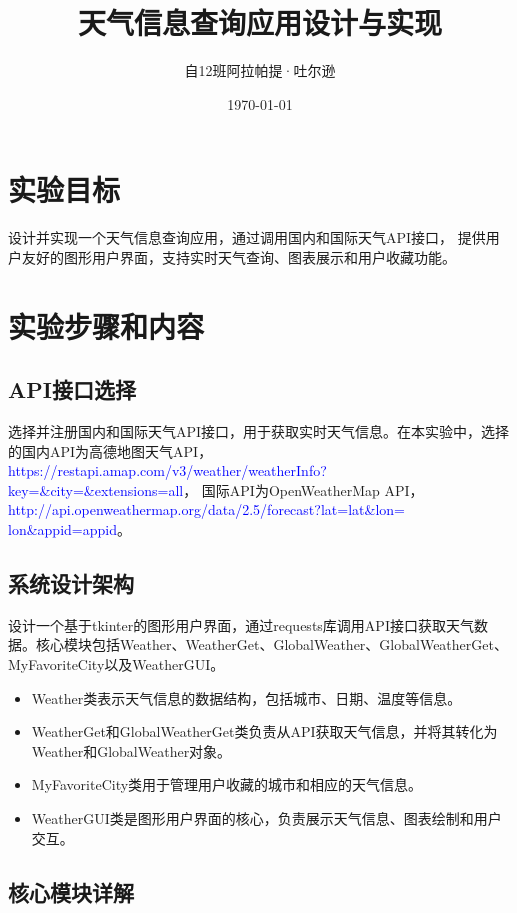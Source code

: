 \documentclass[UTF8]{ctexart}
\title{天气信息查询应用设计与实现}
\author{自12班\quad 阿拉帕提·吐尔逊\quad 2019010363}
\date{\today}
\begin{document}
\maketitle

\section{实验目标}

设计并实现一个天气信息查询应用，通过调用国内和国际天气API接口，
提供用户友好的图形用户界面，支持实时天气查询、图表展示和用户收藏功能。

\section{实验步骤和内容}

\subsection{API接口选择}
选择并注册国内和国际天气API接口，用于获取实时天气信息。在本实验中，选择的国内API为高德地图天气API，
\textcolor{blue}{https://restapi.amap.com/v3/weather/weatherInfo?key={}\&city={}\&extensions=all}，
国际API为OpenWeatherMap API，
\textcolor{blue}{http://api.openweathermap.org/data/2.5/forecast?lat={lat}\&lon=\\{lon}\&appid={appid}}。

\subsection{系统设计架构}

设计一个基于tkinter的图形用户界面，通过requests库调用API接口获取天气数据。核心模块包括Weather、WeatherGet、GlobalWeather、GlobalWeatherGet、MyFavoriteCity以及WeatherGUI。
\begin{itemize}
   \item Weather类表示天气信息的数据结构，包括城市、日期、温度等信息。
   \item WeatherGet和GlobalWeatherGet类负责从API获取天气信息，并将其转化为Weather和GlobalWeather对象。
   \item MyFavoriteCity类用于管理用户收藏的城市和相应的天气信息。
   \item WeatherGUI类是图形用户界面的核心，负责展示天气信息、图表绘制和用户交互。
\end{itemize}

\subsection{核心模块详解}
\end{document}
